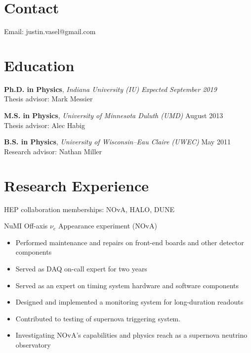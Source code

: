 \documentclass[11pt]{cv}
\begin{document}

\begin{cv}


\section{Contact}
Email: justin.vasel@gmail.com


\section{Education}

\textbf{Ph.D. in Physics}, \emph{Indiana University (IU)} \hfill \emph{Expected September 2019} \\
Thesis advisor: Mark Messier

\textbf{M.S. in Physics}, \emph{University of Minnesota Duluth (UMD)} \hfill August 2013 \\
Thesis advisor: Alec Habig

\textbf{B.S. in Physics}, \emph{University of Wisconsin--Eau Claire (UWEC)} \hfill May 2011 \\
Research advisor: Nathan Miller


\section{Research Experience}

HEP collaboration memberships: NOvA, HALO, DUNE

NuMI Off-axis $\nu_e$ Appearance experiment (NOvA)
\begin{itemize}
  \item Performed maintenance and repairs on front-end boards and other detector components
  \item Served as DAQ on-call expert for two years
  \item Served as an expert on timing system hardware and software components
  \item Designed and implemented a monitoring system for long-duration readouts
  \item Contributed to testing of supernova triggering system.
  \item Investigating NOvA's capabilities and physics reach as a supernova neutrino observatory
\end{itemize}


\end{cv}
\end{document}
